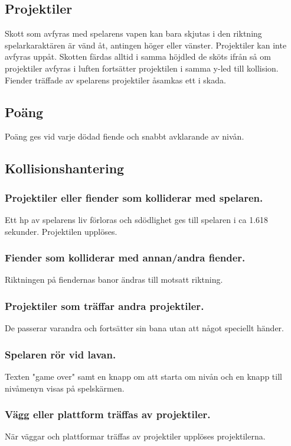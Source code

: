 \documentclass{TDP005mall}
\begin{document}
\subsection{Projektiler}
Skott som avfyras med spelarens vapen kan bara skjutas i den riktning spelarkaraktären är vänd åt, antingen höger eller vänster. Projektiler kan inte avfyras uppåt. Skotten färdas alltid i samma höjdled de sköts ifrån så om projektiler avfyras i luften fortsätter projektilen i samma y-led till kollision. Fiender träffade av spelarens projektiler åsamkas ett i skada.

\subsection{Poäng}
Poäng ges vid varje dödad fiende och snabbt avklarande av nivån.

\subsection{Kollisionshantering}
\subsubsection{Projektiler eller fiender som kolliderar med spelaren.}
Ett hp av spelarens liv förloras och sdödlighet ges till spelaren i ca 1.618 sekunder. Projektilen upplöses.

\subsubsection{Fiender som kolliderar med annan/andra fiender.}
Riktningen på fiendernas banor ändras till motsatt riktning.

\subsubsection{Projektiler som träffar andra projektiler.}
De passerar varandra och fortsätter sin bana utan att något speciellt händer.


\subsubsection{Spelaren rör vid lavan.}
Texten "game over" samt en knapp om att starta om nivån och en knapp till nivåmenyn visas på spelskärmen.

\subsubsection{Vägg eller plattform träffas av projektiler.}
När väggar och plattformar träffas av projektiler upplöses projektilerna.
\end{document}
